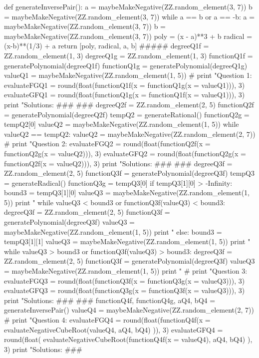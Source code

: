 \documentclass{ximera}
\begin{document}
\begin{sagesilent}
def generateInversePair():
    a = maybeMakeNegative(ZZ.random_element(3, 7))
    b = maybeMakeNegative(ZZ.random_element(3, 7))
    while a == b or a == -b:
        a = maybeMakeNegative(ZZ.random_element(3, 7))
        b = maybeMakeNegative(ZZ.random_element(3, 7))
    poly = (x - a)**3 + b
    radical = (x-b)**(1/3) + a
    return [poly, radical, a, b]
#####
degreeQ1f = ZZ.random_element(1, 3)
degreeQ1g = ZZ.random_element(1, 3)
functionQ1f = generatePolynomial(degreeQ1f)
functionQ1g = generatePolynomial(degreeQ1g)
valueQ1 = maybeMakeNegative(ZZ.random_element(1, 5))
#
print "Question 1:\n %
evaluateFGQ1 = round(float(functionQ1f(x = functionQ1g(x = valueQ1))), 3)
evaluateGFQ1 = round(float(functionQ1g(x = functionQ1f(x = valueQ1))), 3)
print "Solutions: \n %
###
###
degreeQ2f = ZZ.random_element(2, 5)
functionQ2f = generatePolynomial(degreeQ2f)
tempQ2 = generateRational()
functionQ2g = tempQ2[0]
valueQ2 = maybeMakeNegative(ZZ.random_element(1, 5))
while valueQ2 == tempQ2:
    valueQ2 = maybeMakeNegative(ZZ.random_element(2, 7))
#
print "Question 2:\n %
evaluateFGQ2 = round(float(functionQ2f(x = functionQ2g(x = valueQ2))), 3)
evaluateGFQ2 = round(float(functionQ2g(x = functionQ2f(x = valueQ2))), 3)
print "Solutions: \n %
###
###
degreeQ3f = ZZ.random_element(2, 5)
functionQ3f = generatePolynomial(degreeQ3f)
tempQ3 = generateRadical()
functionQ3g = tempQ3[0]
if tempQ3[1][0] > -Infinity:
    bound3 = tempQ3[1][0]
    valueQ3 = maybeMakeNegative(ZZ.random_element(1, 5))
    print "%
    while valueQ3 < bound3 or functionQ3f(valueQ3) < bound3:
        degreeQ3f = ZZ.random_element(2, 5)
        functionQ3f = generatePolynomial(degreeQ3f)
        valueQ3 = maybeMakeNegative(ZZ.random_element(1, 5))
        print "%
else:
    bound3 = tempQ3[1][1]
    valueQ3 = maybeMakeNegative(ZZ.random_element(1, 5))
    print "%
    while valueQ3 > bound3 or functionQ3f(valueQ3) > bound3:
        degreeQ3f = ZZ.random_element(2, 5)
        functionQ3f = generatePolynomial(degreeQ3f)
        valueQ3 = maybeMakeNegative(ZZ.random_element(1, 5))
        print "%
#
print "Question 3:\n %
evaluateFGQ3 = round(float(functionQ3f(x = functionQ3g(x = valueQ3))), 3)
evaluateGFQ3 = round(float(functionQ3g(x = functionQ3f(x = valueQ3))), 3)
print "Solutions: \n %
###
###
functionQ4f, functionQ4g, aQ4, bQ4 = generateInversePair()
valueQ4 = maybeMakeNegative(ZZ.random_element(2, 7))
#
print "Question 4: \n %
evaluateFGQ4 = round(float(functionQ4f(x = evaluateNegativeCubeRoot(valueQ4, aQ4, bQ4) )), 3)
evaluateGFQ4 = round(float( evaluateNegativeCubeRoot(functionQ4f(x = valueQ4), aQ4, bQ4) ), 3)
print "Solutions: \n %
###
 

\end{sagesilent}
\end{document}
